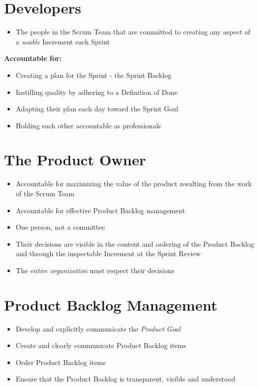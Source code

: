 \documentclass[a4paper,11pt,twocolumn]{article}
\begin{document}
\section*{Developers}
\begin{itemize}
	\item The people in the Scrum Team that are committed to creating any aspect of a \textit{usable} Increment each Sprint
\end{itemize}
\textbf{Accountable for:}
\begin{itemize}
	\item Creating a plan for the Sprint - the Sprint Backlog
	\item Instilling quality by adhering to a Definition of Done
	\item Adapting their plan each day toward the Sprint Goal
	\item Holding each other accountable as professionals
\end{itemize}

\section*{The Product Owner}
\begin{itemize}
	\item Accountable for maximizing the value of the product resulting from the work of the Scrum Team
	\item Accountable for effective Product Backlog management
	\item One person, not a committee
	\item Their decisions are visible in the content and ordering of the Product Backlog and through the inspectable Increment at the Sprint Review
	\item The \textit{entire organization} must respect their decisions
\end{itemize}

\section*{Product Backlog Management}
\begin{itemize}
	\item Develop and explicitly communicate the \textit{Product Goal}
	\item Create and clearly communicate Product Backlog items
	\item Order Product Backlog items
	\item Ensure that the Product Backlog is transparent, visible and understood
\end{itemize}
\end{document}
